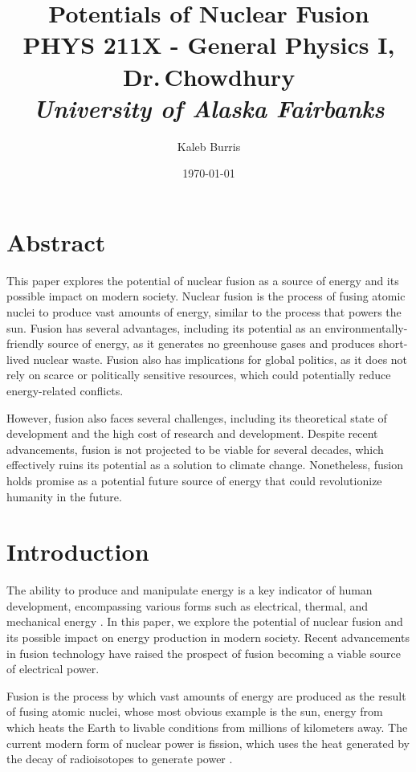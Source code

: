 \documentclass[12pt]{article}
\title{
    \textbf{Potentials of Nuclear Fusion} 
    \\
    \vspace{0.5cm}
    \large PHYS 211X - General Physics I, Dr.\,Chowdhury
    \\
    \emph{University of Alaska Fairbanks}
}
\date{\today}
\author{
    Kaleb Burris
}
\begin{document}
    \maketitle

    \thispagestyle{plain}

    \section{Abstract}

    This paper explores the potential of nuclear fusion as a source of energy and its possible impact on modern society. Nuclear fusion is the process of fusing atomic nuclei to produce vast amounts of energy, similar to the process that powers the sun. Fusion has several advantages, including its potential as an environmentally-friendly source of energy, as it generates no greenhouse gases and produces short-lived nuclear waste. Fusion also has implications for global politics, as it does not rely on scarce or politically sensitive resources, which could potentially reduce energy-related conflicts. 
    
    However, fusion also faces several challenges, including its theoretical state of development and the high cost of research and development. Despite recent advancements, fusion is not projected to be viable for several decades, which effectively ruins its potential as a solution to climate change. Nonetheless, fusion holds promise as a potential future source of energy that could revolutionize humanity in the future.

    \pagebreak

    \section{Introduction}

    The ability to produce and manipulate energy is a key indicator of human development, encompassing various forms such as electrical, thermal, and mechanical energy \citep[215]{hdbp}. In this paper, we explore the potential of nuclear fusion and its possible impact on energy production in modern society. Recent advancements in fusion technology \citep{reed_2022} have raised the prospect of fusion becoming a viable source of electrical power.

    Fusion is the process by which vast amounts of energy are produced as the result of fusing atomic nuclei, whose most obvious example is the sun, energy from which heats the Earth to livable conditions from millions of kilometers away. The current modern form of nuclear power is fission, which uses the heat generated by the decay of radioisotopes to generate power \citep{iaea_2022}.
    
\end{document}
